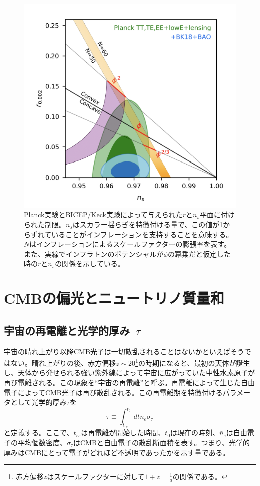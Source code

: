 \begin{figure}[htbp]
  \centering
  \includegraphics[width=0.9\columnwidth]{2_cosmology/figs/latest_results.png}
  \caption{Planck実験とBICEP/Keck実験によって与えられた$r$と$n_{s}$平面に付けられた制限\cite{const_r}。$n_{s}$はスカラー揺らぎを特徴付ける量で、この値が1からずれていることがインフレーションを支持することを意味する。$N$はインフレーションによるスケールファクターの膨張率を表す。また、実線でインフラトンのポテンシャルが$\phi$の冪乗だと仮定した時の$r$と$n_{s}$の関係を示している。}
  \label{const_r}
\end{figure}

\section{CMBの偏光とニュートリノ質量和}

\subsection{宇宙の再電離と光学的厚み~$\tau$}
\label{reion_and_tau}
宇宙の晴れ上がり以降CMB光子は一切散乱されることはないかといえばそうではない。晴れ上がりの後、赤方偏移$z\sim 20$\footnote{赤方偏移$z$はスケールファクターに対して$1+z = \frac{1}{a}$の関係である。}の時期になると、最初の天体が誕生し、天体から発せられる強い紫外線によって宇宙に広がっていた中性水素原子が再び電離される。この現象を``宇宙の再電離''と呼ぶ。再電離によって生じた自由電子によってCMB光子は再び散乱される。この再電離期を特徴付けるパラメータとして光学的厚み$\tau$を
\begin{equation}
  \tau\equiv\int_{t_{rs}}^{t_{0}}dt\bar{n}_{e}\sigma_{\tau}
\end{equation}
と定義する。ここで、$t_{rs}$は再電離が開始した時間、$t_{0}$は現在の時刻、$\bar{n}_{e}$は自由電子の平均個数密度、$\sigma_{\tau}$はCMBと自由電子の散乱断面積を表す。つまり、光学的厚みはCMBにとって電子がどれほど不透明であったかを示す量である。

